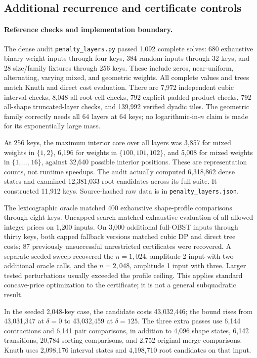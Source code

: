 \documentclass[11pt]{article}
\begin{document}
\subsection{Additional recurrence and certificate controls}
\paragraph{Reference checks and implementation boundary.}
The dense audit \texttt{penalty\_layers.py} passed 1,092 complete solves:
680 exhaustive binary-weight inputs through four keys, 384 random inputs
through 32 keys, and 28 size/family fixtures through 256 keys. These include
zeros, near-uniform, alternating, varying mixed, and geometric weights.
All complete values and trees match Knuth and direct cost evaluation.
There are 7,972 independent cubic interval checks, 8,048 all-root cell
checks, 792 explicit padded-product checks, 792 all-shape truncated-layer
checks, and 139,992 verified dyadic tiles. The geometric family correctly
needs all 64 layers at 64 keys; no logarithmic-in-$n$ claim is made for
its exponentially large mass.

At 256 keys, the maximum interior core over all layers was 3,857 for
mixed weights in $\{1,2\}$, 6,196 for weights in $\{100,101,102\}$,
and 5,008 for mixed weights in $\{1,\ldots,16\}$, against 32,640 possible
interior positions. These are representation counts, not runtime speedups.
The audit actually computed 6,318,862 dense states and examined 12,381,033
root candidates across its full suite. It constructed 11,912 keys.
Source-hashed raw data is in \texttt{penalty\_layers.json}.

The lexicographic oracle matched 400 exhaustive shape-profile comparisons
through eight keys. Uncapped search matched exhaustive evaluation of all
allowed integer prices on 1,200 inputs. On 3,000 additional full-OBST
inputs through thirty keys, both capped fallback versions matched cubic
DP and direct tree costs; 87 previously unsuccessful unrestricted
certificates were recovered. A separate seeded sweep recovered the
$n=1,024$, amplitude 2 input with two additional oracle calls, and the
$n=2,048$, amplitude 1 input with three. Larger tested perturbations
usually exceeded the profile ceiling. This applies standard concave-price
optimization to the certificate; it is not a general subquadratic result.

In the seeded 2,048-key case, the candidate costs 43,032,446; the bound
rises from 43,031,347 at $\delta=0$ to 43,032,459 at $\delta=125$.
The three extra passes use 6,144 contractions and 6,141 pair comparisons,
in addition to 4,096 shape states, 6,142 transitions, 20,784 sorting
comparisons, and 2,752 original merge comparisons. Knuth uses 2,098,176
interval states and 4,198,710 root candidates on that input.
\end{document}
